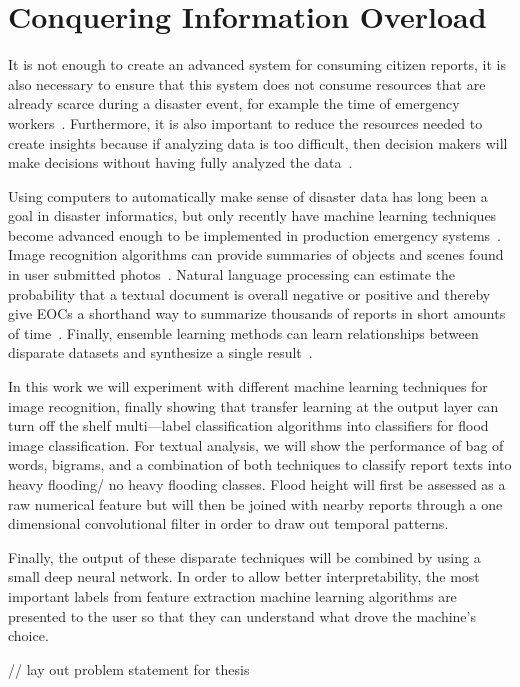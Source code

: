 \section{Conquering Information Overload} It is not enough to create an advanced
system for consuming citizen reports, it is also necessary to ensure that this
system does not consume resources that are already scarce during a disaster
event, for example the time of emergency
workers~\cite{aminDataNaturalDisasters2008}. Furthermore, it is also important
to reduce the
resources needed to create insights because if analyzing data is too 
difficult, then decision makers will make decisions without having fully
analyzed the data~\cite{quarantelliUrbanVulnerabilityDisasters2003}.

Using computers to automatically make sense of disaster data has long
been a goal in disaster informatics, but only recently have machine
learning techniques become advanced enough to be implemented in production
emergency systems~\cite{meierDigitalHumanitariansHow2015}. Image
recognition algorithms can provide summaries of objects and scenes found
in user submitted photos~\cite{nguyenRapidClassificationCrisisRelated,
donahueDeCAFDeepConvolutional2013}. Natural language processing can
estimate the probability that a textual document is overall negative or
positive and thereby give EOCs a shorthand way to summarize thousands of
reports in short amounts of
time~\cite{nguyenRapidClassificationCrisisRelated,
nagyCrowdSentimentDetection2012}. Finally, ensemble learning methods can
learn relationships between disparate datasets and synthesize a single
result~\cite{mouzannarDamageIdentificationSocial2018}.

In this work we will experiment with different machine learning techniques
for image recognition, finally showing that transfer learning at the 
output layer can turn off the shelf multi---label  classification
algorithms into classifiers for flood image classification. For textual analysis, 
we will show the performance of bag of words, bigrams, and a combination of 
both techniques to classify report texts into heavy flooding/ no heavy flooding classes.
Flood height will first be assessed as a raw numerical feature but will then be 
joined with nearby reports through a one dimensional convolutional filter in order
to draw out temporal patterns. 

Finally, the output of these disparate techniques will be combined by using a 
small deep neural network. In order to allow better interpretability, the
most important labels from feature extraction machine learning algorithms are
presented to the user so that they can understand what drove the machine's
choice.

	// lay out problem statement for thesis
